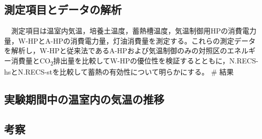 \documentclass[
  japanese,
  11pt,
  letterpaper,
  DIV=11,
  numbers=noendperiod]{scrartcl}
\begin{document}
\begin{table}[H]

\caption{\label{tbl-exp_setting}各実験区における熱源の設定温度と栽培槽の制御温度}


\end{table}%

\subsection{測定項目とデータの解析}\label{ux6e2cux5b9aux9805ux76eeux3068ux30c7ux30fcux30bfux306eux89e3ux6790}

　測定項目は温室内気温，培養土温度，蓄熱槽温度，気温制御用HPの消費電力量，W-HPとA-HPの消費電力量，灯油消費量を測定する。これらの測定データを解析し，W-HPと従来法であるA-HPおよび気温制御のみの対照区のエネルギー消費量とCO\textsubscript{2}排出量を比較してW-HPの優位性を検証するとともに，N.RECS-hsとN.RECS-stを比較して蓄熱の有効性について明らかにする。
\# 結果

\subsection{実験期間中の温室内の気温の推移}\label{ux5b9fux9a13ux671fux9593ux4e2dux306eux6e29ux5ba4ux5185ux306eux6c17ux6e29ux306eux63a8ux79fb}

\subsection{考察}\label{ux8003ux5bdf}
\end{document}
